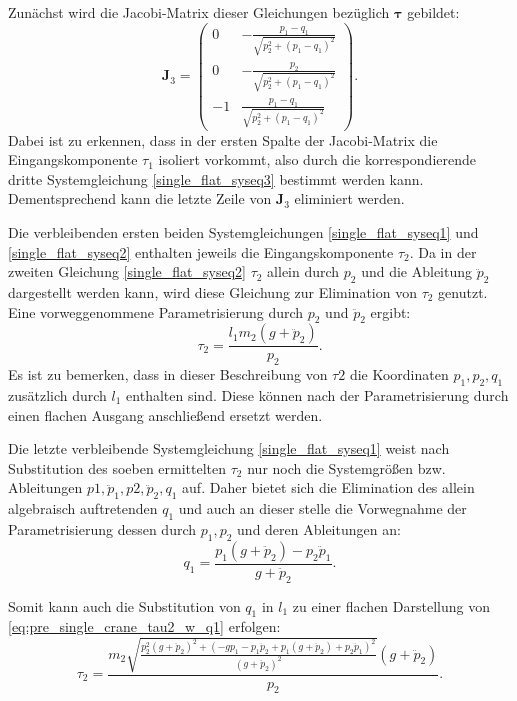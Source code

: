 Zunächst wird die Jacobi-Matrix dieser Gleichungen bezüglich $\mathbf{\tau}$ gebildet:
\begin{equation}
	\mathbf{J}_3 =
	\left(\begin{matrix}
		0 & - \frac{p_{1} - q_{1}}{\sqrt{p_{2}^{2} + \left(p_{1} - q_{1}\right)^{2}}}\\
		0 & - \frac{p_{2}}{\sqrt{p_{2}^{2} + \left(p_{1} - q_{1}\right)^{2}}}\\
		-1 & \frac{p_{1} - q_{1}}{\sqrt{p_{2}^{2} + \left(p_{1} - q_{1}\right)^{2}}}
	\end{matrix}\right).
\end{equation}
Dabei ist zu erkennen, dass in der ersten Spalte der Jacobi-Matrix die Eingangskomponente $\tau_{1}$ isoliert vorkommt, also durch die korrespondierende dritte Systemgleichung \ref{single_flat_syseq3} bestimmt werden kann. Dementsprechend kann die letzte Zeile von $\mathbf{J}_3$ eliminiert werden.

Die verbleibenden ersten beiden Systemgleichungen \ref{single_flat_syseq1} und \ref{single_flat_syseq2} enthalten jeweils die Eingangskomponente $\tau_2$. Da in der zweiten Gleichung \ref{single_flat_syseq2} $\tau_2$ allein durch $p_2$ und die Ableitung $\ddot{p}_2$ dargestellt werden kann, wird diese Gleichung zur Elimination von $\tau_2$ genutzt. Eine vorweggenommene Parametrisierung durch $p_2$ und $\ddot{p}_2$ ergibt:
\begin{equation}
	\label{eq:pre_single_crane_tau2_w_q1}
	\tau_2 = \frac{l_{1} m_{2} \left(g + \ddot{p}_{2}\right)}{p_{2}}.
\end{equation}
Es ist zu bemerken, dass in dieser Beschreibung von $\tau2$ die Koordinaten $p_1, p_2, q_1$ zusätzlich durch $l_1$ enthalten sind. Diese können nach der Parametrisierung durch einen flachen Ausgang anschließend ersetzt werden. 

Die letzte verbleibende Systemgleichung \ref{single_flat_syseq1} weist nach Substitution des soeben ermittelten $\tau_2$ nur noch die Systemgrößen bzw. Ableitungen $p1, \ddot{p}_1, p2, \ddot{p}_2, q_1$ auf. Daher bietet sich die Elimination des allein algebraisch auftretenden $q_1$ und auch an dieser stelle die Vorwegnahme der Parametrisierung dessen durch $p_1, p_2$ und deren Ableitungen an: 
\begin{equation}
	q_1 = \frac{p_{1} \left(g + \ddot{p}_{2}\right) - p_{2} \ddot{p}_{1}}{g + \ddot{p}_{2}}.
\end{equation}

Somit kann auch die Substitution von $q_1$ in $l_1$ zu einer flachen Darstellung von \ref{eq:pre_single_crane_tau2_w_q1} erfolgen:
\begin{equation}
	\tau_2 =
	\frac{m_{2} \sqrt{\frac{p_{2}^{2} \left(g + \ddot{p}_{2}\right)^{2} + \left(- g p_{1} - p_{1} \ddot{p}_{2} + p_{1} \left(g + \ddot{p}_{2}\right) + p_{2} \ddot{p}_{1}\right)^{2}}{\left(g + \ddot{p}_{2}\right)^{2}}} \left(g + \ddot{p}_{2}\right)}{p_{2}}.
\end{equation}


